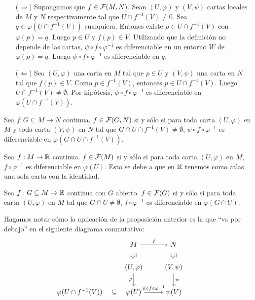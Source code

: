 \documentclass[cursovd_portada.tex]{subfiles}
\begin{document}
\begin{dem}\mbox{}
\begin{itemize}
	\item[($\Rightarrow$)] Supongamos que $f \in {\cal F}(M,N)$. Sean $(U,φ)$ y $(V,ψ)$ cartas locales de $M$ y $N$ respectivamente tal que $U \cap f^{-1}(V) \neq 0$. Sea $q \in φ(U \cap f^{-1}(V))$ cualquiera. Entones existe $p \in U \cap f^{-1}(V)$ con $φ(p)=q$. Luego $p \in U$ y $f(p) \in V$. Utilizando que la definición no depende de las cartas, $ψ \circ f \circ φ^{-1}$ es diferenciable en un entorno $W$ de $φ(p)=q$. Luego $ψ \circ f \circ φ^{-1}$ es diferenciable en $q$.
	\item[($\Leftarrow$)] Sea $(U,φ)$ una carta en $M$ tal que $p \in U$ y $(V,ψ)$ una carta en $N$ tal que $f(p) \in V$. Como $p \in f^{-1}(V)$, entonces $p \in U \cap f^{-1}(V)$. Luego $U \cap f^{-1}(V) \neq \emptyset$. Por hipótesis, $ψ \circ f \circ φ^{-1}$ es diferenciable en $φ(U \cap f^{-1}(V))$. \QED
\end{itemize}
\begin{coro} Sea $f : G \subseteq M \to N$ continua. $f \in {\cal F}(G,N)$ si y sólo si para toda carta $(U,φ)$ en $M$ y toda carta $(V,ψ)$ en $N$ tal que  $G \cap U \cap f^{-1}(V) \neq \emptyset$, $ψ \circ f \circ φ^{-1}$ es diferenciable en $φ(G \cap U \cap f^{-1}(V))$.
\end{coro}
\begin{coro} Sea $f : M \to \mathbb{R}$ continua. $f \in {\cal F}(M)$ si y sólo si para toda carta $(U,φ)$ en $M$, $f \circ φ^{-1}$ es diferenciable en $φ(U)$. Esto se debe a que en $\mathbb{R}$ tenemos como atlas una sola carta con la identidad.
\end{coro}
\begin{coro} Sea $f : G \subseteq M \to \mathbb{R}$ continua con $G$ abierto. $f \in {\cal F}(G)$ si y sólo si para toda carta $(U,φ)$ en $M$ tal que $G \cap U \neq \emptyset$, $f \circ φ^{-1}$ es diferenciable en $φ(G \cap U)$.
\end{coro}
\end{dem}
Hagamos notar c\'omo la aplicaci\'on de la proposici\'on anterior es la que ``va por debajo'' en el siguiente diagrama conmutativo:
\[
\begin{tikzcd}
& M  \arrow[r, "f"] & N & \\
& (U,\varphi)\arrow[u,phantom, "\rotatebox{90}{$\subseteq$}"]\arrow[d,"\varphi"']  & (V,\psi)\arrow[d,"\psi"]\arrow[u,phantom, "\rotatebox{90}{$\subseteq$}"] &  \\
\varphi(U\cap f^{-1}(V))\arrow[r,phantom, "{\subseteq}"] & \varphi(U) \arrow[r,"\psi\circ f\circ\varphi^{-1}"] & \psi(V)& 
\end{tikzcd}
\]
\end{document}
